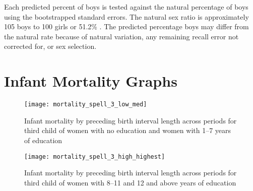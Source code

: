 \documentclass[12pt,letterpaper]{article}
\begin{document}
Each predicted percent of boys is tested against the natural percentage of
boys using the bootstrapped standard errors.
The natural sex ratio is approximately 105 boys to 100 girls or
51.2\% \citep{ben-porath76b,jacobsen99,Portner2015b}.
The predicted percentage boys may differ from the natural rate because of 
natural variation, any remaining recall error not corrected for, or 
sex selection. 


















\clearpage
\newpage


\section{Infant Mortality Graphs}

\setcounter{figure}{0}
\setcounter{table}{0}


\begin{figure}
\centering
\texttt{[image: mortality\_spell\_3\_low\_med]}
\caption{Infant mortality by preceding birth interval length across periods for third child of women with 
no education and women with 1--7 years of education}
\label{fig:mortality_low_med_spell_3}
\end{figure}


\begin{figure}
\centering
\texttt{[image: mortality\_spell\_3\_high\_highest]}
\caption{Infant mortality by preceding birth interval length across periods for third child of women with 
8--11 and 12 and above years of education}
\label{fig:mortality_high_highest_spell_3}
\end{figure}
\end{document}
